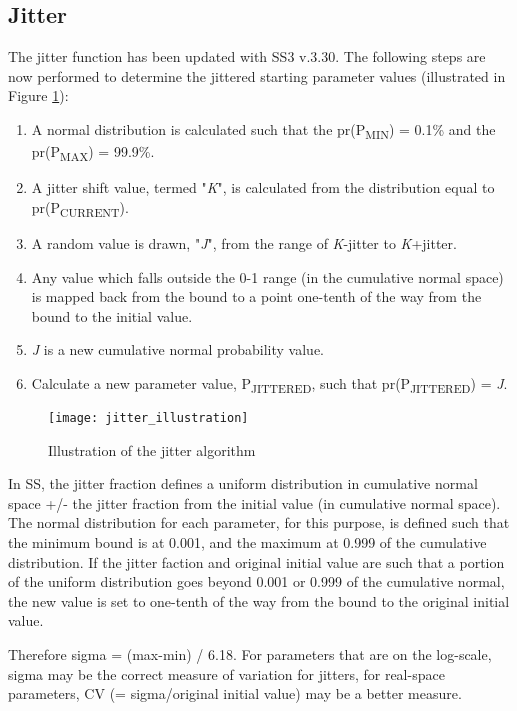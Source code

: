 \subsection{Jitter}
\hypertarget{Jitter}{}
The jitter function has been updated with SS3 v.3.30.  The following steps are now performed to determine the jittered starting parameter values (illustrated in Figure \ref{fig:jitter}):
\begin{enumerate}
	\item A normal distribution is calculated such that the pr(P\textsubscript{MIN}) = 0.1\% and the pr(P\textsubscript{MAX}) = 99.9\%.
	\item A jitter shift value, termed "\textit{K}", is calculated from the distribution equal to pr(P\textsubscript{CURRENT}).
	\item A random value is drawn, "\textit{J}", from the range of \textit{K}-jitter to \textit{K}+jitter.
	\item Any value which falls outside the 0-1 range (in the cumulative normal space) is mapped back from the bound to a point one-tenth of the way from the bound to the initial value.
	\item \textit{J} is a new cumulative normal probability value.
	\item Calculate a new parameter value, P\textsubscript{JITTERED}, such that pr(P\textsubscript{JITTERED}) = \textit{J}.
\end{enumerate}

\begin{figure}[h]
	\begin{center}
		\texttt{[image: jitter\_illustration]}\\
		\caption{Illustration of the jitter algorithm}
		\label{fig:jitter}
	\end{center}
\end{figure}

In SS, the jitter fraction defines a uniform distribution in cumulative normal space +/- the jitter fraction from the initial value (in cumulative normal space). The normal distribution for each parameter, for this purpose, is defined such that the minimum bound is at 0.001, and the maximum at 0.999 of the cumulative distribution. If the jitter faction and original initial value are such that a portion of the uniform distribution goes beyond 0.001 or 0.999 of the cumulative normal, the new value is set to one-tenth of the way from the bound to the original initial value. 

Therefore sigma = (max-min) / 6.18. For parameters that are on the log-scale, sigma may be the correct measure of variation for jitters, for real-space parameters, CV (= sigma/original initial value) may be a better measure. 

